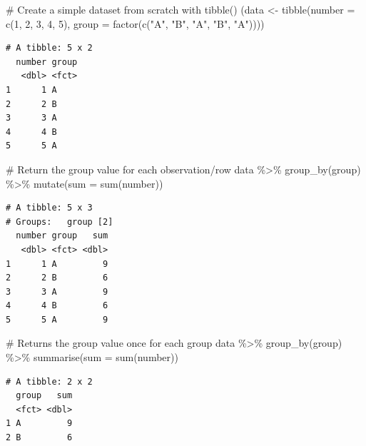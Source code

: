 \documentclass[
  letterpaper,
]{krantz}
\makeatletter
\newenvironment{Shaded}{\begin{snugshade}}{\end{snugshade}}
\newcommand{\AttributeTok}[1]{\textcolor[rgb]{0.40,0.45,0.13}{#1}}
\newcommand{\CommentTok}[1]{\textcolor[rgb]{0.37,0.37,0.37}{#1}}
\newcommand{\DecValTok}[1]{\textcolor[rgb]{0.68,0.00,0.00}{#1}}
\newcommand{\FunctionTok}[1]{\textcolor[rgb]{0.28,0.35,0.67}{#1}}
\newcommand{\NormalTok}[1]{\textcolor[rgb]{0.00,0.23,0.31}{#1}}
\newcommand{\OtherTok}[1]{\textcolor[rgb]{0.00,0.23,0.31}{#1}}
\newcommand{\SpecialCharTok}[1]{\textcolor[rgb]{0.37,0.37,0.37}{#1}}
\newcommand{\StringTok}[1]{\textcolor[rgb]{0.13,0.47,0.30}{#1}}
\newenvironment{kframe}{%
\medskip{}
\setlength{\fboxsep}{.8em}
 \def\at@end@of@kframe{}%
 \ifinner\ifhmode%
  \def\at@end@of@kframe{\end{minipage}}%
  \begin{minipage}{\columnwidth}%
 \fi\fi%
 \def\FrameCommand##1{\hskip\@totalleftmargin \hskip-\fboxsep
 \colorbox{shadecolor}{##1}\hskip-\fboxsep
     \hskip-\linewidth \hskip-\@totalleftmargin \hskip\columnwidth}%
 \MakeFramed {\advance\hsize-\width
   \@totalleftmargin\z@ \linewidth\hsize
   \@setminipage}}%
 {\par\unskip\endMakeFramed%
 \at@end@of@kframe}
\renewenvironment{Shaded}{\begin{kframe}}{\end{kframe}}
\makeatother
\begin{document}
\begin{Shaded}
\begin{Highlighting}[]
\CommentTok{\# Create a simple dataset from scratch with tibble()}
\NormalTok{(data }\OtherTok{\textless{}{-}} \FunctionTok{tibble}\NormalTok{(}\AttributeTok{number =} \FunctionTok{c}\NormalTok{(}\DecValTok{1}\NormalTok{, }\DecValTok{2}\NormalTok{, }\DecValTok{3}\NormalTok{, }\DecValTok{4}\NormalTok{, }\DecValTok{5}\NormalTok{),}
               \AttributeTok{group =} \FunctionTok{factor}\NormalTok{(}\FunctionTok{c}\NormalTok{(}\StringTok{"A"}\NormalTok{, }\StringTok{"B"}\NormalTok{, }\StringTok{"A"}\NormalTok{, }\StringTok{"B"}\NormalTok{, }\StringTok{"A"}\NormalTok{))))}
\end{Highlighting}
\end{Shaded}

\begin{verbatim}
# A tibble: 5 x 2
  number group
   <dbl> <fct>
1      1 A    
2      2 B    
3      3 A    
4      4 B    
5      5 A    
\end{verbatim}

\begin{Shaded}
\begin{Highlighting}[]
\CommentTok{\# Return the group value for each observation/row}
\NormalTok{data }\SpecialCharTok{\%\textgreater{}\%}
  \FunctionTok{group\_by}\NormalTok{(group) }\SpecialCharTok{\%\textgreater{}\%}
  \FunctionTok{mutate}\NormalTok{(}\AttributeTok{sum =} \FunctionTok{sum}\NormalTok{(number))}
\end{Highlighting}
\end{Shaded}

\begin{verbatim}
# A tibble: 5 x 3
# Groups:   group [2]
  number group   sum
   <dbl> <fct> <dbl>
1      1 A         9
2      2 B         6
3      3 A         9
4      4 B         6
5      5 A         9
\end{verbatim}

\begin{Shaded}
\begin{Highlighting}[]
\CommentTok{\# Returns the group value once for each group}
\NormalTok{data }\SpecialCharTok{\%\textgreater{}\%}
  \FunctionTok{group\_by}\NormalTok{(group) }\SpecialCharTok{\%\textgreater{}\%}
  \FunctionTok{summarise}\NormalTok{(}\AttributeTok{sum =} \FunctionTok{sum}\NormalTok{(number))}
\end{Highlighting}
\end{Shaded}

\begin{verbatim}
# A tibble: 2 x 2
  group   sum
  <fct> <dbl>
1 A         9
2 B         6
\end{verbatim}
\end{document}

